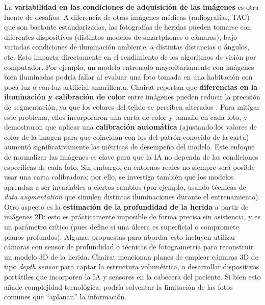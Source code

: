 La \textbf{variabilidad en las condiciones de adquisición de las imágenes} es otra fuente de desafíos. A diferencia de otras imágenes médicas (radiografías, TAC) que son bastante estandarizadas, las fotografías de heridas pueden tomarse con diferentes dispositivos (distintos modelos de smartphones o cámaras), bajo variadas condiciones de iluminación ambiente, a distintas distancias o ángulos, etc. Esto impacta directamente en el rendimiento de los algoritmos de visión por computador. Por ejemplo, un modelo entrenado mayoritariamente con imágenes bien iluminadas podría fallar al evaluar una foto tomada en una habitación con poca luz o con luz artificial amarillenta. Chairat reportan que \textbf{diferencias en la iluminación y calibración de color} entre imágenes pueden reducir la precisión de segmentación, ya que los colores del tejido se perciben alterados \cite{healthcare11020273}. Para mitigar este problema, ellos incorporaron una carta de color y tamaño en cada foto, y demostraron que aplicar una \textbf{calibración automática} (ajustando los valores de color de la imagen para que coincidan con los del patrón conocido de la carta) aumentó significativamente las métricas de desempeño del modelo. Este enfoque de normalizar las imágenes es clave para que la IA no dependa de las condiciones específicas de cada foto. Sin embargo, en entornos reales no siempre será posible usar una carta calibradora; por ello, se investiga también que los modelos aprendan a ser invariables a ciertos cambios (por ejemplo, usando técnicas de \textit{data augmentation} que simulen distintas iluminaciones durante el entrenamiento). Otro aspecto es la \textbf{estimación de la profundidad de la herida} a partir de imágenes 2D: esto es prácticamente imposible de forma precisa sin asistencia, y es un parámetro crítico (pues define si una úlcera es superficial o compromete planos profundos). Algunas propuestas para abordar esto incluyen utilizar cámaras con sensor de profundidad o técnicas de fotogrametría para reconstruir un modelo 3D de la herida. Chairat mencionan planes de emplear cámaras 3D de tipo \textit{depth sensor} para captar la estructura volumétrica, o desarrollar dispositivos portátiles que incorporen la IA y sensores en la cabecera del paciente. Si bien esto añade complejidad tecnológica, podría solventar la limitación de las fotos comunes que “aplanan” la información. 

